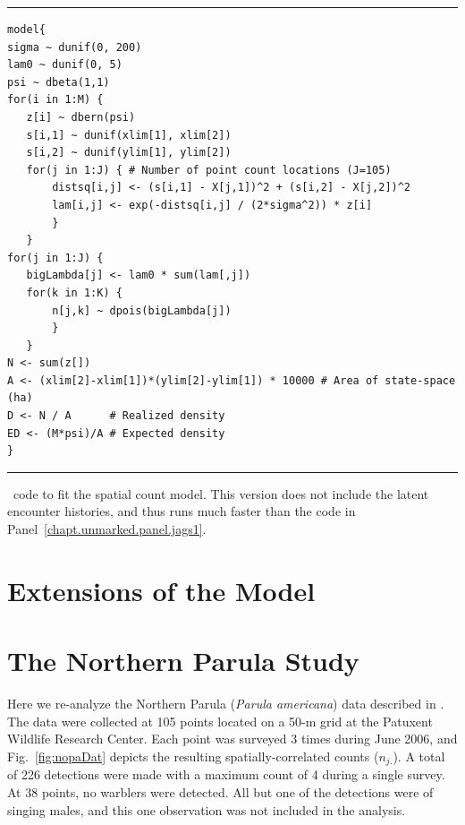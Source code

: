 \begin{panel}
\centering
\rule[0.05in]{\textwidth}{.03in}
\begin{small}
\begin{verbatim}
model{
sigma ~ dunif(0, 200)
lam0 ~ dunif(0, 5)
psi ~ dbeta(1,1)
for(i in 1:M) {
   z[i] ~ dbern(psi)
   s[i,1] ~ dunif(xlim[1], xlim[2])
   s[i,2] ~ dunif(ylim[1], ylim[2])
   for(j in 1:J) { # Number of point count locations (J=105)
       distsq[i,j] <- (s[i,1] - X[j,1])^2 + (s[i,2] - X[j,2])^2
       lam[i,j] <- exp(-distsq[i,j] / (2*sigma^2)) * z[i]
       }
   }
for(j in 1:J) {
   bigLambda[j] <- lam0 * sum(lam[,j])
   for(k in 1:K) {
       n[j,k] ~ dpois(bigLambda[j])
       }
   }
N <- sum(z[])
A <- (xlim[2]-xlim[1])*(ylim[2]-ylim[1]) * 10000 # Area of state-space (ha)
D <- N / A      # Realized density
ED <- (M*psi)/A # Expected density
}
\end{verbatim}
\end{small}
\rule[0.15in]{\textwidth}{.03in}
\caption{\jags~code to fit the spatial count model. This version
  does not include the latent encounter histories, and thus runs much
  faster than the code in Panel~\ref{chapt.unmarked.panel.jags1}.}
\label{chapt.unmarked.panel.jags2}
\end{panel}



\section{Extensions of the Model}
\label{chapt.unmarked.ext}





\section{The Northern Parula Study}

Here we re-analyze the Northern Parula ({\it Parula americana}) data
described in \citet{chandler_royle:2012}. The data were collected at
105 points located on a 50-m grid at the Patuxent Wildlife Research
Center. Each point was surveyed 3 times during June 2006, and
Fig.~\ref{fig:nopaDat} depicts the resulting spatially-correlated
counts ($n_{j.}$). A total of 226 detections were made with a maximum
count of 4 during a single survey. At 38 points, no warblers were
detected. All but one of the detections were of singing males, and
this one observation was not included in the analysis.

